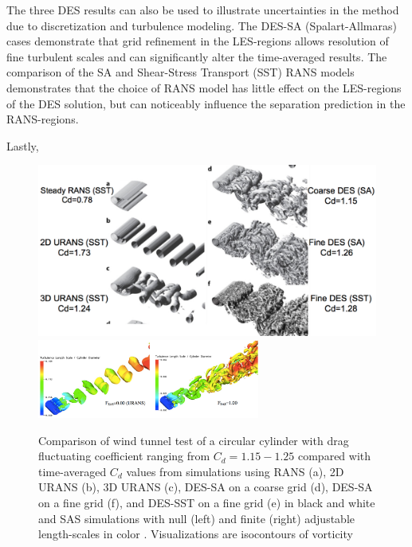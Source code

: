\documentclass[journal]{new-aiaa}
\begin{document}
The three DES results can also be used to illustrate uncertainties in the method due to discretization and turbulence modeling. The DES-SA (Spalart-Allmaras) cases demonstrate that grid refinement in the LES-regions allows resolution of fine turbulent scales and can significantly alter the time-averaged results. The comparison of the SA and Shear-Stress Transport (SST) RANS models demonstrates that the choice of RANS model has little effect on the LES-regions of the DES solution, but can noticeably influence the separation prediction in the RANS-regions.

Lastly,


\begin{figure}[H]
\begin{center}
\includegraphics[width=1.0\textwidth]{Images/logan/spalart2009detachededdy_cylindersCD.pdf}
\includegraphics[width=0.65\textwidth]{Images/logan/menter2005scaleadaptive_cylinderwake.pdf}
\caption{ Comparison of wind tunnel test of a circular cylinder with drag fluctuating coefficient ranging from $C_d=1.15-1.25$ compared with time-averaged $C_d$ values from simulations using RANS (a), 2D URANS (b), 3D URANS (c), DES-SA on a coarse grid (d), DES-SA on a fine grid (f), and DES-SST on a fine grid (e) \cite{spalart2009detachededdy} in black and white and SAS simulations with null (left) and finite (right) adjustable length-scales in color \cite{menter2005scaleadaptive}. Visualizations are isocontours of vorticity }
\label{fig:cylinderturbmodels}
\end{center}
\end{figure}
\end{document}
